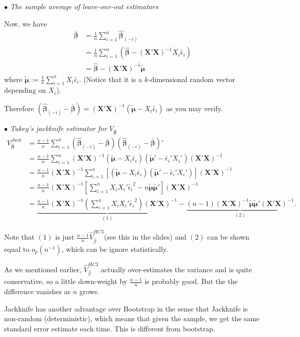 \documentclass[11pt,a4paper]{amsart}
\theoremstyle{plain}
\theoremstyle{definition}
\begin{document}
	$\bullet$\emph{ The sample average of leave-one-out estimators} \par 
	Now, we have 
	\[	\begin{aligned}
	\bar{\bm{\beta}} &= \frac{1}{n}\sum_{i=1}^{n}\hat{\bm{\beta}}_{(-i)} \\
	&=  \frac{1}{n}\sum_{i=1}^{n}\left(\bm{\hat{\beta}} - (\bm{X}'\bm{X})^{-1}X_{i}\tilde{\epsilon_{i}}\right) \\
	&= \bm{\hat{\beta}} - (\bm{X}'\bm{X})^{-1}\tilde{\bm{\mu}}
	\end{aligned}	\]
	where $\tilde{\bm{\mu}} := \frac{1}{n}\sum_{i=1}^{n}X_{i}\tilde{\epsilon_{i}}$. (Notice that it is a $k$-dimensional random vector depending on $X_{i}$).\par 
	Therefore $ \left(\hat{\bm{\beta}}_{(-i)} - \bar{\bm{\beta}}\right) = (\bm{X}'\bm{X})^{-1}(\tilde{\bm{\mu}} - X_{i}\tilde{\epsilon_{i}})$ as you may verify.
	\par 
	$\bullet$ \emph{Tukey’s jackknife estimator for} $V_{\hat{\bm{\beta}}}$
	\[	\begin{aligned}
	V_{\hat{\bm{\beta}}}^{Jack} &= \frac{n-1}{n}\sum_{i=1}^{n} \left(\hat{\bm{\beta}}_{(-i)} - \bar{\bm{\beta}}\right) \left(\hat{\bm{\beta}}_{(-i)} - \bar{\bm{\beta}}\right)'  \\
	&= \frac{n-1}{n}\sum_{i=1}^{n} (\bm{X}'\bm{X})^{-1}(\tilde{\bm{\mu}} - X_{i}\tilde{\epsilon_{i}}) (\tilde{\bm{\mu}}' - \tilde{\epsilon_{i}}'X_{i}')  (\bm{X}'\bm{X})^{-1} \\
	&= \frac{n-1}{n}(\bm{X}'\bm{X})^{-1} \sum_{i=1}^{n} \left[(\tilde{\bm{\mu}} - X_{i}\tilde{\epsilon_{i}}) (\tilde{\bm{\mu}}' - \tilde{\epsilon_{i}}'X_{i}') \right] (\bm{X}'\bm{X})^{-1}\\
	&=  \frac{n-1}{n}(\bm{X}'\bm{X})^{-1}  \left[ \sum_{i=1}^{n} X_{i}X_{i}' \tilde{\epsilon_{i}}^{2}  -n \tilde{\bm{\mu}} \tilde{\bm{\mu}}'  \right] (\bm{X}'\bm{X})^{-1} \\
	&= 	\underbrace{ \frac{n-1}{n}(\bm{X}'\bm{X})^{-1}  \left( \sum_{i=1}^{n} X_{i}X_{i}' \tilde{\epsilon_{i}}^{2}    \right) (\bm{X}'\bm{X})^{-1}}_{(1)} -  \underbrace{(n-1)(\bm{X}'\bm{X})^{-1}   \tilde{\bm{\mu}} \tilde{\bm{\mu}}'  (\bm{X}'\bm{X})^{-1}}_{(2)}.
	\end{aligned}	\]\par 
	Note that $(1)$ is just $\frac{n-1}{n} \hat{V}_{\hat{\beta}}^{HC3}$(see this in the slides) and $(2)$ can be shown equal to $o_{p}(n^{-1})$, which can be ignore statistically. \par 
	As we mentioned earlier, $\hat{V}_{\hat{\beta}}^{HC3}$ actually over-estimates the variance and is quite conservative, so a little down-weight by $\frac{n-1}{n}$ is probably good. But the the difference vanishes as $n$ grows.\par 
	Jackknife has another advantage over Bootstrap in the sense that Jackknife is non-random (deterministic), which means that given the sample, we get the same standard error estimate each time. This is different from bootstrap. 
	
\end{document}
